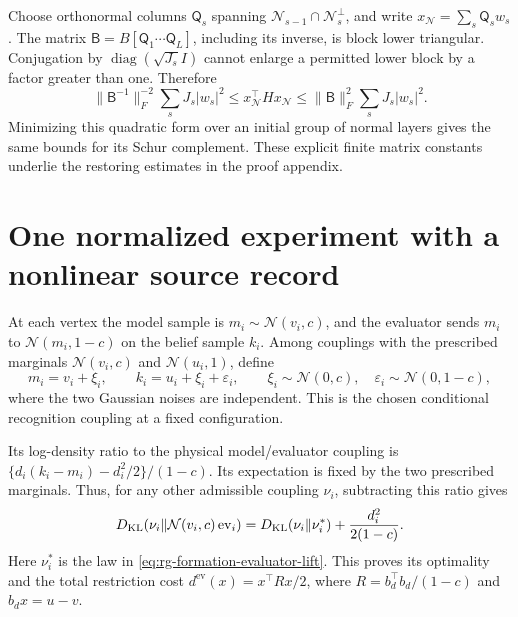 Choose orthonormal columns \(\mathsf Q_s\) spanning
\(\mathcal N_{s-1}\cap\mathcal N_s^\perp\), and write
\(x_{\mathcal N}=\sum_s\mathsf Q_sw_s\). The matrix
\(\mathsf B=B[\mathsf Q_1\cdots\mathsf Q_L]\), including its inverse, is block lower
triangular. Conjugation by
\(\operatorname{diag}(\sqrt{J_s}I)\) cannot enlarge a permitted lower
block by a factor greater than one. Therefore
\begin{equation}
\|\mathsf B^{-1}\|_F^{-2}\sum_sJ_s|w_s|^2
\le x_{\mathcal N}^{\top}Hx_{\mathcal N}
\le\|\mathsf B\|_F^2\sum_sJ_s|w_s|^2.
\label{eq:rg-formation-weighted-flag}
\end{equation}
Minimizing this quadratic form over an initial group of normal layers
gives the same bounds for its Schur complement. These explicit finite
matrix constants underlie the restoring estimates in the proof appendix.

\section{One normalized experiment with a nonlinear source record}
\label{sec:rg-formation-normalized-model}

At each vertex the model sample is \(m_i\sim\mathcal N(v_i,c)\), and
the evaluator sends \(m_i\) to \(\mathcal N(m_i,1-c)\) on the belief
sample \(k_i\). Among couplings with the prescribed marginals
\(\mathcal N(v_i,c)\) and \(\mathcal N(u_i,1)\), define
\begin{equation}
m_i=v_i+\xi_i,\qquad
k_i=u_i+\xi_i+\varepsilon_i,\qquad
\xi_i\sim\mathcal N(0,c),\quad
\varepsilon_i\sim\mathcal N(0,1-c),
\label{eq:rg-formation-evaluator-lift}
\end{equation}
where the two Gaussian noises are independent. This is the chosen
conditional recognition coupling at a fixed configuration.

Its log-density ratio to the physical model/evaluator coupling is
\(\{d_i(k_i-m_i)-d_i^2/2\}/(1-c)\). Its expectation is fixed by
the two prescribed marginals. Thus, for any other admissible coupling
\(\nu_i\), subtracting this ratio gives
\begin{equation}
D_{\mathrm{KL}}(\nu_i\Vert
  \mathcal N(v_i,c)\operatorname{ev}_i)
=D_{\mathrm{KL}}(\nu_i\Vert\nu_i^*)+\frac{d_i^2}{2(1-c)}.
\label{eq:rg-formation-evaluator-optimum}
\end{equation}
Here \(\nu_i^*\) is the law in
\cref{eq:rg-formation-evaluator-lift}. This proves its optimality and
the total restriction cost
\(d^{\mathrm{ev}}(x)=x^\top Rx/2\), where
\(R=b_d^\top b_d/(1-c)\) and \(b_dx=u-v\).


